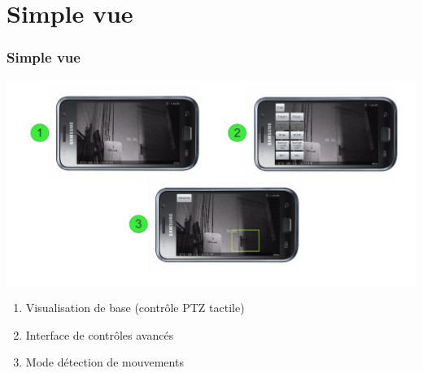 \section{Simple vue}
  \begin{frame}
   \frametitle{Simple vue}

  \centering
     \includegraphics[scale=0.5]{Images/ImageSlide6.pdf}

	\begin{minipage}{0.65\textwidth}
     \begin{enumerate}
    \item Visualisation de base (contrôle PTZ tactile)
    \item Interface de contrôles avancés
    \item Mode détection de mouvements
   \end{enumerate}
   \end{minipage}

  \end{frame}
